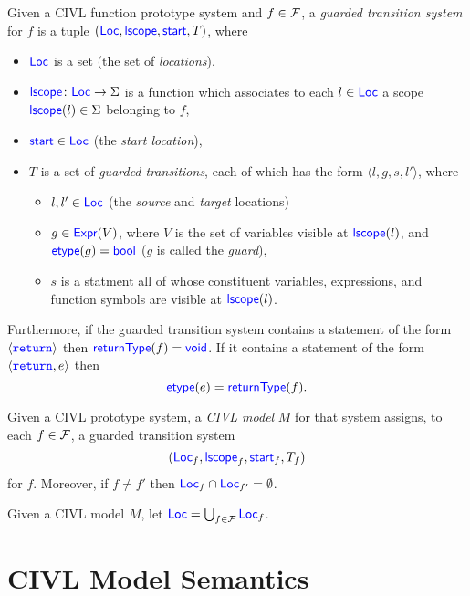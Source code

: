 \begin{definition}
  Given a CIVL function prototype system and $f\in\Func$,
  a \emph{guarded transition system} for $f$ 
  is a tuple $(\Loc,\lscope,\start, T)$, where
  \begin{itemize}
  \item $\Loc$ is a set (the set of \emph{locations}),
  \item $\lscope\colon\Loc\ra\Sigma$ is a function which associates
    to each $l\in\Loc$ a scope $\lscope(l)\in\Sigma$ belonging to $f$,
  \item $\start\in\Loc$ (the \emph{start location}),
  \item $T$ is a set of \emph{guarded transitions}, each of which has
    the form $\langle l,g,s,l'\rangle$, where
    \begin{itemize}
    \item $l,l'\in\Loc$ (the \emph{source} and \emph{target}
      locations)
    \item $g\in\Expr(V)$, where $V$ is the set of variables visible at
      $\lscope(l)$, and $\etype(g)=\bool$ ($g$ is called the
      \emph{guard}),
    \item $s$ is a statment all of whose constituent variables,
      expressions, and function symbols are visible at $\lscope(l)$.
    \end{itemize}
  \end{itemize}
  Furthermore, if the guarded transition system contains a statement
  of the form $\langle\code{return}\rangle$ then
  $\returntype(f)=\void$.  If it contains a statement of the form
  $\langle\code{return},e\rangle$ then
  \[
  \etype(e)=\returntype(f).
  \]
\end{definition}

\begin{definition}
  Given a CIVL prototype system, a \emph{CIVL model} $M$ for that
  system assigns, to each $f\in\Func$, a guarded transition system
  \[(\Loc_f,\lscope_f, \start_f,T_f)\] for $f$.  Moreover, if $f\neq f'$
  then
  $\Loc_f\cap\Loc_{f'}=\emptyset$.
\end{definition}

\begin{definition}
  Given a CIVL model $M$, let $\Loc=\bigcup_{f\in\Func}\Loc_f$.
\end{definition}

\chapter{CIVL Model Semantics}
\label{sec:semantics}

